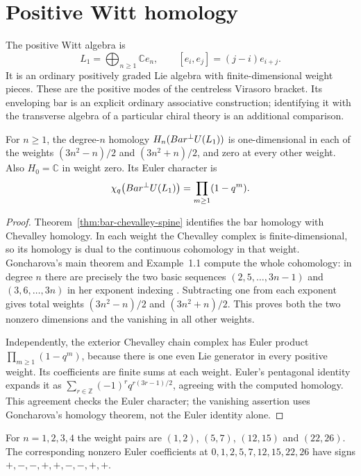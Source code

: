 \section{Positive Witt homology}
The positive Witt algebra is
\[
 L_1=\bigoplus_{n\ge1}\mathbb C e_n,
 \qquad[e_i,e_j]=(j-i)e_{i+j}.
\]
It is an ordinary positively graded Lie algebra with finite-dimensional weight pieces.
These are the positive modes of the centreless Virasoro bracket.
Its enveloping bar is an explicit ordinary associative construction;
identifying it with the transverse algebra of a particular chiral theory is
an additional comparison.

\begin{theorem}
\label{thm:pentagonal-spine}
For $n\ge1$, the degree-$n$ homology $H_n(Bar^{\perp} U(L_1))$ is one-dimensional in each
of the weights $(3n^2-n)/2$ and $(3n^2+n)/2$, and zero at every other weight.
Also $H_0=\mathbb C$ in weight zero. Its Euler character is
\begin{equation}\label{eq:witt-euler-spine}
 \chi_q\bigl(Bar^{\perp} U(L_1)\bigr)=\prod_{m\ge1}(1-q^m).
\end{equation}
\end{theorem}
\begin{proof}
Theorem~\ref{thm:bar-chevalley-spine} identifies the bar homology with
Chevalley homology. In each weight the Chevalley complex is finite-dimensional,
so its homology is dual to the continuous cohomology in that weight.
Goncharova's main theorem and Example~1.1 compute the whole cohomology:
in degree $n$ there are precisely the two basic sequences
$(2,5,\ldots,3n-1)$ and $(3,6,\ldots,3n)$ in her exponent indexing
\cite{Goncharova1973}. Subtracting one from each exponent gives total weights
$(3n^2-n)/2$ and $(3n^2+n)/2$.
This proves both the two nonzero dimensions and the vanishing in all other weights.

Independently, the exterior Chevalley chain complex has Euler product
$\prod_{m\ge1}(1-q^m)$, because there is one even Lie generator in every
positive weight. Its coefficients are finite sums at each weight.
Euler's pentagonal identity expands it as
$\sum_{r\in\mathbb Z}(-1)^r q^{r(3r-1)/2}$, agreeing with the computed homology.
This agreement checks the Euler character; the vanishing assertion uses
Goncharova's homology theorem, not the Euler identity alone.
\end{proof}

For $n=1,2,3,4$ the weight pairs are $(1,2)$, $(5,7)$, $(12,15)$ and $(22,26)$.
The corresponding nonzero Euler coefficients at
$0,1,2,5,7,12,15,22,26$ have signs $+,-,-,+,+,-,-,+,+$.

